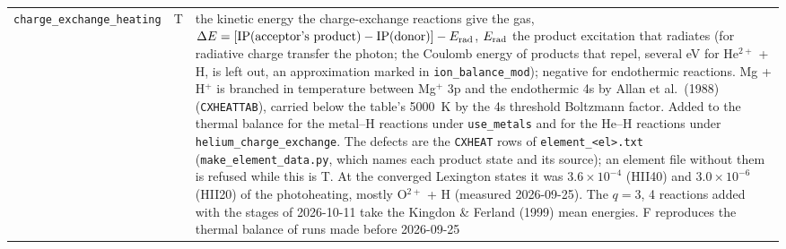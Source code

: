 \documentclass[english,a4paper]{my_memo}
\newcommand{\code}[1]{\texttt{#1}}
\begin{document}
{\begin{longtable}{llp{7.2cm}}
\code{charge\_exchange\_heating} & T & the kinetic energy the charge-exchange reactions give the gas, $\Delta E = [{\rm IP}(\text{acceptor's product}) - {\rm IP}(\text{donor})] - E_{\rm rad}$, $E_{\rm rad}$ the product excitation that radiates (for radiative charge transfer the photon; the Coulomb energy of products that repel, several eV for He$^{2+}$ + H, is left out, an approximation marked in \code{ion\_balance\_mod}); negative for endothermic reactions.  Mg + H$^+$ is branched in temperature between Mg$^+$ 3p and the endothermic 4s by Allan et al.\ (1988) (\code{CXHEATTAB}), carried below the table's 5000~K by the 4s threshold Boltzmann factor.  Added to the thermal balance for the metal--H reactions under \code{use\_metals} and for the He--H reactions under \code{helium\_charge\_exchange}.  The defects are the \code{CXHEAT} rows of \code{element\_<el>.txt} (\code{make\_element\_data.py}, which names each product state and its source); an element file without them is refused while this is T.  At the converged Lexington states it was $3.6{\times}10^{-4}$ (HII40) and $3.0{\times}10^{-6}$ (HII20) of the photoheating, mostly O$^{2+}$ + H (measured 2026-09-25).  The $q = 3$, 4 reactions added with the stages of 2026-10-11 take the Kingdon \& Ferland (1999) mean energies.  F reproduces the thermal balance of runs made before 2026-09-25 \\
\end{longtable}
}
\end{document}
